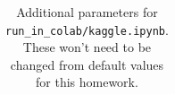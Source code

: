 \documentclass[11pt,addpoints,answers]{exam}
\begin{document}
\begin{questions}
\begin{table}[H]
\begin{tabular}{|p{0.33\linewidth}|p{0.3\linewidth}|p{0.3\linewidth}|}
\end{tabular}
\caption{Additional parameters for \lstinline{run_in_colab/kaggle.ipynb}. These won't need to be changed from default values for this homework.}
\label{table:default}
\end{table}


\pagebreak









\end{questions}
\end{document}
